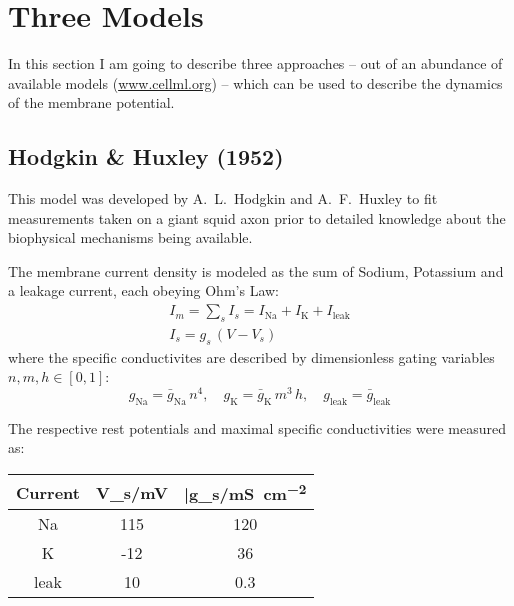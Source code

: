 \newcommand{\Vtilde}{\ensuremath{\tilde{V}}}

\section{Three Models}
In this section I am going to describe three approaches -- out of an
abundance of available models (\url{www.cellml.org}) -- which can be used to
describe the dynamics of the membrane potential.

\subsection{Hodgkin \& Huxley (1952)}
This model was developed by A.~L.~Hodgkin and A.~F.~Huxley to fit
measurements taken on a giant squid axon prior to detailed knowledge about
the biophysical mechanisms being available.

The membrane current density is modeled as the sum of Sodium, Potassium and
a leakage current, each obeying Ohm's Law:
\begin{gather}
    I_m = \sum_{s}I_{s}=I_{\mathrm{Na}}+I_{\mathrm{K}}+I_{\mathrm{leak}} \\
    I_s = g_s\,(V-V_s) \nonumber
\end{gather}
where the specific conductivites are described by dimensionless gating
variables $n, m, h\in[0,1]$:
\begin{equation*}
    g_{\mathrm{Na}}=\bar{g}_{\mathrm{Na}}\,n^4,\quad
    g_{\mathrm{K}}=\bar{g}_{\mathrm{K}}\,m^3\,h,\quad
    g_{\mathrm{leak}}=\bar{g}_{\mathrm{leak}}
\end{equation*}

The respective rest potentials and maximal specific conductivities were measured as:
\begin{table}[h!]
    \centering
    \begin{tabular}{c | C C}
        \toprule
        Current & V_s/\si{\milli\volt} &
        \bar{g}_s/\si{\milli\siemens\per\centi\metre\squared} \\
        \midrule
        Na      & 115   & 120   \\
        K       & -12   & 36    \\
        leak    & 10    & 0.3   \\
        \bottomrule
    \end{tabular}
\end{table}

